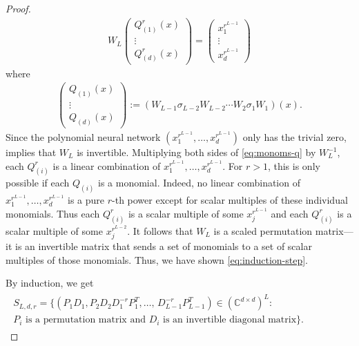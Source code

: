 \documentclass[12pt]{article}
\theoremstyle{definition}
\newcommand{\qrw}[1]{q_{\mathbf{w}_{#1}}^r}
\newcommand{\qw}[1]{q_{\mathbf{w}_{#1}}}
\renewcommand{\qrw}[1]{Q_{({#1})}^r}
\renewcommand{\qw}[1]{Q_{({#1})}}
\begin{document}
\begin{proof}
\begin{align}\label{eq:monoms-q}
W_L
\begin{pmatrix}
\qrw{1}(x)\\
\vdots\\
\qrw{d}(x)
\end{pmatrix}
=
\begin{pmatrix}
x_1^{r^{L-1}}\\
\vdots\\
x_d^{r^{L-1}}
\end{pmatrix}
\end{align}
%
where 
\begin{align*}
    \begin{pmatrix}
        \qw{1}(x)\\
        \vdots\\
        \qw{d}(x)
    \end{pmatrix}
    :=
        (W_{L-1}\sigma_{L-2}W_{L-2}\dotsb W_2\sigma_1 W_1)(x).
\end{align*}
Since the polynomial neural network $(x_1^{r^{L-1}},\dotsc,x_d^{r^{L-1}})$ only has the trivial zero,  implies that $W_L$ is invertible. Multiplying both sides of \eqref{eq:monoms-q} by $W_L^{-1}$, each $\qrw{i}$ 
is a linear combination of $x_1^{r^{L-1}},\dotsc,x_d^{r^{L-1}}$. For $r >1$, this is only possible if each 
$\qw{i}$
is a monomial. 
Indeed, no linear combination of $x_1^{r^{L-1}},\dotsc,x_d^{r^{L-1}}$ is a pure $r$-th power except for scalar multiples of these individual monomials. Thus each 
$\qrw{i}$
is a scalar multiple of some $x_j^{r^{L-1}}$ and each
$\qrw{i}$
is a scalar multiple of some $x_j^{r^{L-2}}$. 
It follows that $W_L$ is a scaled permutation matrix---it is an invertible matrix that sends a set of monomials to a set of scalar multiples of those monomials. 
Thus, we have shown \eqref{eq:induction-step}.



By induction, we get 
\begin{align*}
\begin{split}
S_{L,d,r}=
\Big\{
(P_1D_1,
P_2D_2D_1^{-r}P_1^T,
\dots,\,
D_{L-1}^{-r} P_{L-1}^T)
\in 
\left(\mathbb{C}^{d\times d}\right)^L:
\,\phantom{\text{ is a permutation matrix}}&\\
P_i \text{ is a permutation matrix and }D_i\text{ is an invertible diagonal matrix}
\Big\}.
\end{split}
\end{align*}


\end{proof}
\end{document}
